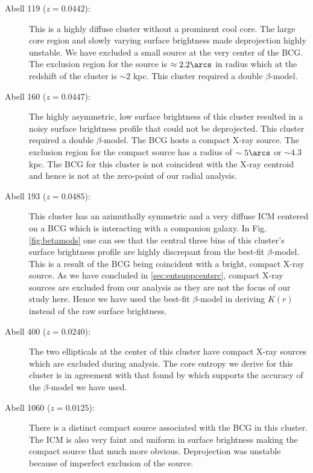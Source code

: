 \begin{description}
\item[Abell 119 ($z=0.0442$):] This is a highly diffuse cluster
  without a prominent cool core. The large core region and slowly
  varying surface brightness made deprojection highly unstable. We
  have excluded a small source at the very center of the BCG. The
  exclusion region for the source is $\approx 2.2\arcs$ in radius
  which at the redshift of the cluster is $\sim 2$ kpc. This cluster
  required a double $\beta$-model.

\item[Abell 160 ($z=0.0447$):] The highly asymmetric, low surface
  brightness of this cluster resulted in a noisy surface brightness
  profile that could not be deprojected. This cluster required a
  double $\beta$-model. The BCG hosts a compact X-ray source. The
  exclusion region for the compact source has a radius of $\sim
  5\arcs$ or $\sim 4.3$ kpc. The BCG for this cluster is not
  coincident with the X-ray centroid and hence is not at the
  zero-point of our radial analysis.

\item[Abell 193 ($z=0.0485$):] This cluster has an azimuthally
  symmetric and a very diffuse ICM centered on a BCG which is
  interacting with a companion galaxy. In Fig. \ref{fig:betamods} one
  can see that the central three bins of this cluster's surface
  brightness profile are highly discrepant from the best-fit
  $\beta$-model. This is a result of the BCG being coincident with a
  bright, compact X-ray source. As we have concluded in
  \ref{sec:entsuppcentsrc}, compact X-ray sources are excluded from our
  analysis as they are not the focus of our study here. Hence we have
  used the best-fit $\beta$-model in deriving $K(r)$ instead of the
  raw surface brightness.

\item[Abell 400 ($z=0.0240$):] The two ellipticals at the center of
  this cluster have compact X-ray sources which are excluded during
  analysis. The core entropy we derive for this cluster is in
  agreement with that found by \cite{2006A&A...453..433H} which
  supports the accuracy of the $\beta$-model we have used.

\item[Abell 1060 ($z=0.0125$):] There is a distinct compact source
  associated with the BCG in this cluster. The ICM is also very faint
  and uniform in surface brightness making the compact source that
  much more obvious. Deprojection was unstable because of imperfect
  exclusion of the source.


\end{description}
